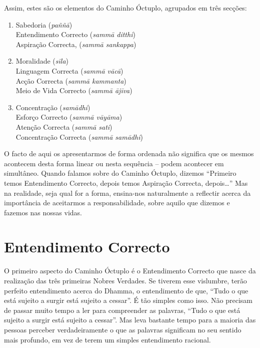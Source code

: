 Assim, estes são os elementos do Caminho Óctuplo, agrupados em três secções:

\begin{enumerate}

\item Sabedoria (\emph{paññā})\\
Entendimento Correcto (\emph{sammā ditthi})\\
Aspiração Correcta, (\emph{sammā sankappa})

\item Moralidade (\emph{sīla})\\
Linguagem Correcta (\emph{sammā vācā})\\
Acção Correcta (\emph{sammā kammanta})\\
Meio de Vida Correcto (\emph{sammā ājīva})

\item Concentração (\emph{samādhi})\\
Esforço Correcto (\emph{sammā vāyāma})\\
Atenção Correcta (\emph{sammā sati})\\
Concentração Correcta (\emph{sammā samādhi})

\end{enumerate}

O facto de aqui os apresentarmos de forma ordenada não significa que os mesmos
acontecem desta forma linear ou nesta sequência – podem acontecer em simultâneo.
Quando falamos sobre do Caminho Óctuplo, dizemos “Primeiro temos Entendimento
Correcto, depois temos Aspiração Correcta, depois\ldots{}” Mas na realidade, seja
qual for a forma, ensina-nos naturalmente a reflectir acerca da importância de
aceitarmos a responsabilidade, sobre aquilo que dizemos e fazemos nas nossas
vidas.

\section{Entendimento Correcto}

O primeiro aspecto do Caminho Óctuplo é o Entendimento Correcto que nasce da
realização das três primeiras Nobres Verdades. Se tiverem esse vislumbre, terão
perfeito entendimento acerca do Dhamma, o entendimento de que, “Tudo o que está
sujeito a surgir está sujeito a cessar”. É tão simples como isso. Não precisam
de passar muito tempo a ler para compreender as palavras, “Tudo o que está
sujeito a surgir está sujeito a cessar”. Mas leva bastante tempo para a maioria
das pessoas perceber verdadeiramente o que as palavras significam no seu sentido
mais profundo, em vez de terem um simples entendimento racional.

